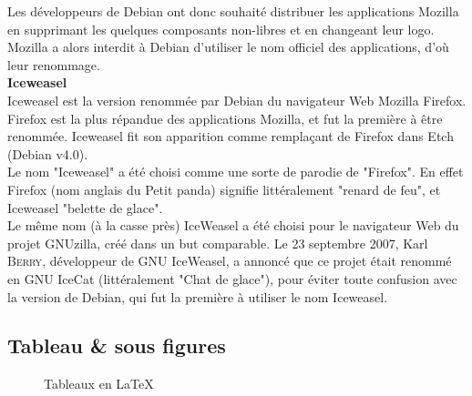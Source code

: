 \documentclass[a4paper]{article}
\begin{document}
			Les développeurs de Debian ont donc souhaité distribuer les applications Mozilla en supprimant les quelques composants non-libres et en changeant leur logo. Mozilla a alors interdit à Debian d'utiliser le nom officiel des applications, d'où leur renommage. \\

			\noindent \textbf{Iceweasel} \\
			
			Iceweasel est la version renommée par Debian du navigateur Web Mozilla Firefox. Firefox est la plus répandue des applications Mozilla, et fut la première à être renommée. Iceweasel fit son apparition comme remplaçant de Firefox dans Etch (Debian v4.0). \\

			Le nom "Iceweasel" a été choisi comme une sorte de parodie de "Firefox". En effet Firefox (nom anglais du Petit panda) signifie littéralement "renard de feu", et Iceweasel "belette de glace". \\

			Le même nom (à la casse près) IceWeasel a été choisi pour le navigateur Web du projet GNUzilla, créé dans un but comparable. Le 23 septembre 2007, Karl \textsc{Berry}, développeur de GNU IceWeasel, a annoncé que ce projet était renommé en GNU IceCat (littéralement "Chat de glace"), pour éviter toute confusion avec la version de Debian, qui fut la première à utiliser le nom Iceweasel. \\

		\subsection{Tableau \& sous figures}

			\begin{figure}[h]
				\centering
				\hspace{1cm}
				\caption{Tableaux en \LaTeX{}}
			\end{figure}
\end{document}
